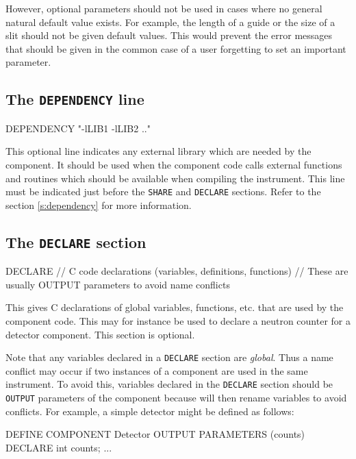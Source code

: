   However, optional parameters should not be used in cases where no general
  natural default value exists. For example, the length of a guide or the size
  of a slit should not be given default values. This would prevent the error
  messages that should be given in the common case of a user forgetting to set
  an important parameter.

\subsection{The \texttt{DEPENDENCY} line}
\label{s:comp-dependency}
\begin{mcstas}
DEPENDENCY "-lLIB1 -lLIB2 .."
\end{mcstas}
This optional line indicates any external library which are needed by the component.
It should be used when the component code calls external functions and routines
which should be available when compiling the instrument. 
This line must be indicated just before the \texttt{SHARE} and \texttt{DECLARE} sections.
Refer to the section \ref{s:dependency} for more information.

\subsection{The \texttt{DECLARE} section}
\label{s:comp-declare}
\begin{mcstas}
DECLARE
// C code declarations (variables, definitions, functions)
// These are usually OUTPUT parameters to avoid name conflicts 
\end{mcstas}
 This gives C declarations of global variables,
functions, etc. that are used by the component code. This may for instance be
used to declare a neutron counter for a detector component. This section is
optional.

Note that any variables declared in a \verb+DECLARE+ section are
\emph{global}. Thus a name conflict may occur if two instances of a component
are used in the same instrument. To avoid this, variables declared in the
\texttt{DECLARE} section should be \texttt{OUTPUT} parameters of the component
because \MCS will then rename variables to avoid conflicts.  For example, a
simple detector might be defined as follows:

\begin{mcstas}
DEFINE COMPONENT Detector
OUTPUT PARAMETERS (counts)
DECLARE
  int counts;
...
\end{mcstas}

